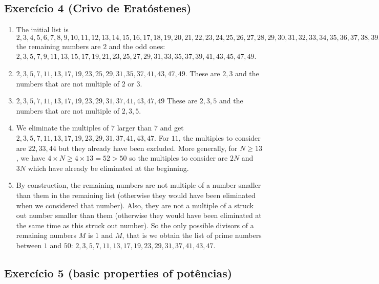 \subsection*{Exercício 4 (Crivo de Eratóstenes)}

\begin{enumerate}
\item The initial list is
  $2,3,4,5,6,7,8,9,10,11,12,13,14,15,16,17,18,19,20,21,22,23,24,25,26,27,28,29,30,31,32,33,34,35,36,37,38,39,40,41,42,43,44,45,46,47,48,49,50$
  the remaining numbers are $2$ and the odd ones:
  $2,3,5,7,9,11,13,15,17,19,21,23,25,27,29,31,33,35,37,39,41,43,45,47,49$.
\item $2,3,5,7,11,13,17,19,23,25,29,31,35,37,41,43,47,49$.
  These are $2,3$ and the numbers that are not multiple of $2$ or $3$.
\item $2,3,5,7,11,13,17,19,23,29,31,37,41,43,47,49$
  These are $2,3,5$ and the numbers that are not multiple of $2,3,5$.
\item
  We eliminate the multiples of $7$ larger than $7$ and get
  $2,3,5,7,11,13,17,19,23,29,31,37,41,43,47$.
  For $11$, the multiples to consider are $22,33,44$ but they already have
  been excluded. More generally, for $N \geq 13$, we have
  $4 \times N \geq 4 \times 13 = 52 > 50$ so the multiples to consider
  are $2N$ and $3N$ which have already be eliminated at the beginning.
\item By construction, the remaining numbers are not multiple of a number
  smaller than them in the remaining list (otherwise they would have been
  eliminated when we considered that number).
  Also, they are not a multiple of a struck out number smaller
  than them (otherwise they would have been eliminated at the same time as
  this struck out number). So the only possible divisors of a remaining
  numbers $M$ is $1$ and $M$, that is we obtain the list of prime numbers
  between $1$ and $50$: $2,3,5,7,11,13,17,19,23,29,31,37,41,43,47$.

\end{enumerate}

\subsection*{Exercício 5 (basic properties of potências)}

